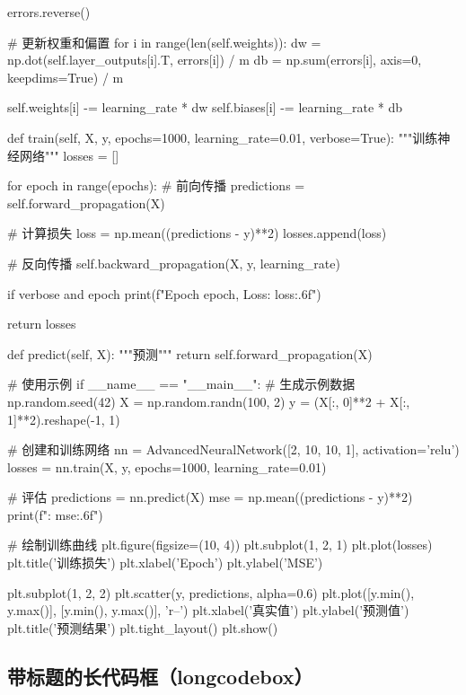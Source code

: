 \begin{longcode}[python]
        errors.reverse()
        
        # 更新权重和偏置
        for i in range(len(self.weights)):
            dw = np.dot(self.layer_outputs[i].T, errors[i]) / m
            db = np.sum(errors[i], axis=0, keepdims=True) / m
            
            self.weights[i] -= learning_rate * dw
            self.biases[i] -= learning_rate * db
    
    def train(self, X, y, epochs=1000, learning_rate=0.01, verbose=True):
        """训练神经网络"""
        losses = []
        
        for epoch in range(epochs):
            # 前向传播
            predictions = self.forward_propagation(X)
            
            # 计算损失
            loss = np.mean((predictions - y)**2)
            losses.append(loss)
            
            # 反向传播
            self.backward_propagation(X, y, learning_rate)
            
            if verbose and epoch %
                print(f"Epoch {epoch}, Loss: {loss:.6f}")
        
        return losses
    
    def predict(self, X):
        """预测"""
        return self.forward_propagation(X)

# 使用示例
if __name__ == "__main__":
    # 生成示例数据
    np.random.seed(42)
    X = np.random.randn(100, 2)
    y = (X[:, 0]**2 + X[:, 1]**2).reshape(-1, 1)
    
    # 创建和训练网络
    nn = AdvancedNeuralNetwork([2, 10, 10, 1], activation='relu')
    losses = nn.train(X, y, epochs=1000, learning_rate=0.01)
    
    # 评估
    predictions = nn.predict(X)
    mse = np.mean((predictions - y)**2)
    print(f": {mse:.6f}")
    
    # 绘制训练曲线
    plt.figure(figsize=(10, 4))
    plt.subplot(1, 2, 1)
    plt.plot(losses)
    plt.title('训练损失')
    plt.xlabel('Epoch')
    plt.ylabel('MSE')
    
    plt.subplot(1, 2, 2)
    plt.scatter(y, predictions, alpha=0.6)
    plt.plot([y.min(), y.max()], [y.min(), y.max()], 'r--')
    plt.xlabel('真实值')
    plt.ylabel('预测值')
    plt.title('预测结果')
    plt.tight_layout()
    plt.show()
\end{longcode}

\subsection{带标题的长代码框（longcodebox）}


